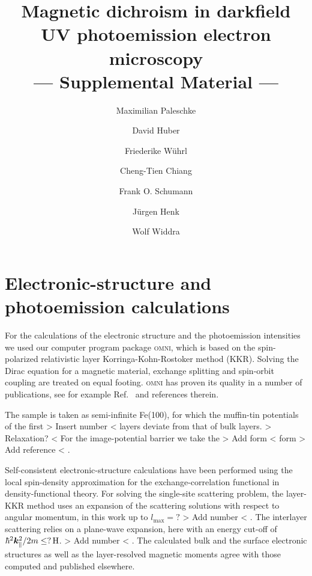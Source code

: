 \documentclass[amsfonts, amssymb, amsmath, preprint, showkeys, twoside, prl, superscriptaddress, aps]{revtex4-2}
\newcommand{\todo}[2][1]{{\color{red} > #2 < }}
\renewcommand{\vec}[1]{\boldsymbol{#1}}
\begin{document}
 

\title{Magnetic dichroism in darkfield UV photoemission electron microscopy  \\ --- Supplemental Material ---}

\author{Maximilian Paleschke}
\author{David Huber}
\author{Friederike Wührl}

\author{Cheng-Tien Chiang}

\author{Frank O. Schumann}

\author{Jürgen Henk}
\author{Wolf Widdra}

\maketitle

\section{Electronic-structure and photoemission calculations}
For the calculations of the electronic structure and the photoemission intensities we used our computer program package \textsc{omni}, which is based on the spin-polarized relativistic layer Korringa-Kohn-Rostoker method (KKR). Solving the Dirac equation for a magnetic material, exchange splitting and spin-orbit coupling are treated on equal footing. \textsc{omni} has proven its quality in a number of publications, see for example Ref.~ and references therein.

The sample is taken as semi-infinite Fe(100), for which the muffin-tin potentials of the first \todo[inline]{Insert number} layers deviate from that of bulk layers. \todo[inline]{Relaxation?} For the image-potential barrier we take the \todo[inline]{Add form} form \todo[inline]{Add reference}.

Self-consistent electronic-structure calculations have been performed using the local spin-density approximation for the exchange-correlation functional in density-functional theory. For solving the single-site scattering problem, the layer-KKR method uses an expansion of the scattering solutions with respect to angular momentum, in this work up to $l_{\mathrm{max}} = ?$\todo[inline]{Add number}. The interlayer scattering relies on a  plane-wave expansion, here with an energy cut-off of $\hbar^{2}\vec{k}_{\parallel}^{2} / 2 m \leq \unit[?]{H}$.\todo[inline]{Add number}. The calculated bulk and the surface electronic structures as well as the layer-resolved magnetic moments agree with those computed and published elsewhere. 
\end{document}
